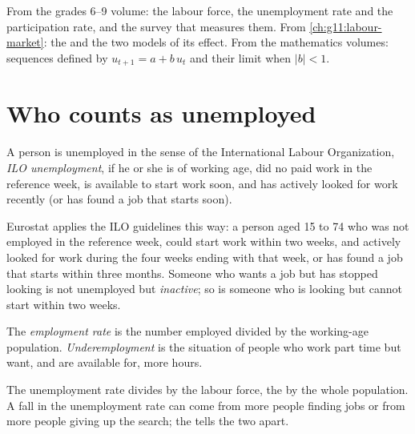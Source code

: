 \begin{recall}
From the grades 6--9 volume: the labour force, the unemployment rate and the participation rate, and the survey that measures them. From
\cref{ch:g11:labour-market}: the  and the two models of its effect. From the mathematics volumes: sequences defined by $u_{t+1} = a + b\,u_t$ and their limit
when $|b| < 1$.
\end{recall}

\section{Who counts as unemployed}\label{sec:g11:unemployment:definitions}

\begin{definition}\label{def:g11:unemployment:ilo}
A person is unemployed in the sense of the International Labour Organization, \emph{ILO unemployment}, if he or she is of working age, did no
paid work in the reference week, is available to start work soon, and has actively looked for work recently (or has found a job that starts soon).
\end{definition}

\begin{measure}
Eurostat applies the ILO guidelines this way: a person aged 15 to 74 who was not employed in the reference week, could start work within two weeks, and actively looked for
work during the four weeks ending with that week, or has found a job that starts within three months. Someone who
wants a job but has stopped looking is not unemployed but \emph{inactive}; so is someone who is looking but cannot start within two weeks.
\end{measure}

\begin{definition}\label{def:g11:unemployment:employment-rate}
The \emph{employment rate} is the number employed divided by the working-age population. \emph{Underemployment}%
\label{def:g11:unemployment:underemployment} is the situation of people who work part time but want, and are available for, more hours.
\end{definition}

The unemployment rate divides by the labour force, the  by the whole population. A fall in the unemployment rate can come from more people finding jobs
or from more people giving up the search; the  tells the two apart.

